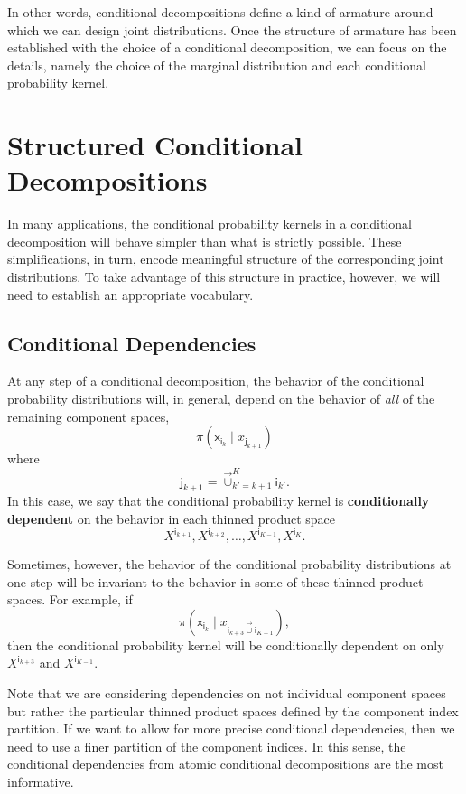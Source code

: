 \documentclass[
  letterpaper,
  DIV=11,
  numbers=noendperiod]{scrartcl}
\begin{document}
In other words, conditional decompositions define a kind of armature
around which we can design joint distributions. Once the structure of
armature has been established with the choice of a conditional
decomposition, we can focus on the details, namely the choice of the
marginal distribution and each conditional probability kernel.

\section{Structured Conditional
Decompositions}\label{structured-conditional-decompositions}

In many applications, the conditional probability kernels in a
conditional decomposition will behave simpler than what is strictly
possible. These simplifications, in turn, encode meaningful structure of
the corresponding joint distributions. To take advantage of this
structure in practice, however, we will need to establish an appropriate
vocabulary.

\subsection{Conditional Dependencies}\label{conditional-dependencies}

At any step of a conditional decomposition, the behavior of the
conditional probability distributions will, in general, depend on the
behavior of \emph{all} of the remaining component spaces, \[
\pi( \mathsf{x}_{ \mathsf{i}_{k} } \mid x_{\mathsf{j}_{k + 1}} )
\] where \[
\mathsf{j}_{k + 1}
=
\vec{\cup}_{k' = k + 1}^{K} \mathsf{i}_{k'}.
\] In this case, we say that the conditional probability kernel is
\textbf{conditionally dependent} on the behavior in each thinned product
space \[
X^{ \mathsf{i}_{k + 1} }, X^{ \mathsf{i}_{k + 2} }, \ldots,
X^{ \mathsf{i}_{K - 1} }, X^{ \mathsf{i}_{K} }.
\]

Sometimes, however, the behavior of the conditional probability
distributions at one step will be invariant to the behavior in some of
these thinned product spaces. For example, if \[
\pi(
  \mathsf{x}_{ \mathsf{i}_{k} } \mid
  x_{ \mathsf{i}_{k + 3} \vec{\cup} \mathsf{i}_{K - 1} }
),
\] then the conditional probability kernel will be conditionally
dependent on only \(X^{ \mathsf{i}_{k + 3} }\) and
\(X^{ \mathsf{i}_{K - 1} }\).

Note that we are considering dependencies on not individual component
spaces but rather the particular thinned product spaces defined by the
component index partition. If we want to allow for more precise
conditional dependencies, then we need to use a finer partition of the
component indices. In this sense, the conditional dependencies from
atomic conditional decompositions are the most informative.
\end{document}

